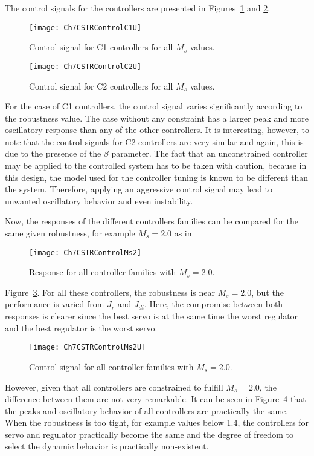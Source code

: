 The control signals for the controllers are presented in Figures~\ref{fig:Ch7CSTRControlC1U} and \ref{fig:Ch7CSTRControlC2U}. %
\begin{figure}[tb]
	\centering
	\texttt{[image: Ch7CSTRControlC1U]}
	\caption{Control signal for C1 controllers for all $M_s$ values.}
	\label{fig:Ch7CSTRControlC1U}
\end{figure}
%
\begin{figure}[tb]
	\centering
	\texttt{[image: Ch7CSTRControlC2U]}
	\caption{Control signal for C2 controllers for all $M_s$ values.}
	\label{fig:Ch7CSTRControlC2U}
\end{figure}
%
For the case of C1 controllers, the control signal varies significantly according to the robustness value. The case without any constraint has a larger peak and more oscillatory response than any of the other controllers. It is interesting, however, to note that the control signals for C2 controllers are very similar and again, this is due to the presence of the $\beta$ parameter. The fact that an unconstrained controller may be applied to the controlled system has to be taken with caution, because in this design, the model used for the controller tuning is known to be different than the system. Therefore, applying an aggressive control signal may lead to unwanted oscillatory behavior and even instability.

Now, the responses of the different controllers families can be compared for the same given robustness, for example $M_s = 2.0$ as in %
\begin{figure}[tb]
	\centering
	\texttt{[image: Ch7CSTRControlMs2]}
	\caption{Response for all controller families with $M_s = 2.0$.}
	\label{fig:Ch7CSTRControlMs2}
\end{figure}
%
Figure~\ref{fig:Ch7CSTRControlMs2}. For all these controllers, the robustness is near $M_s = 2.0$, but the performance is varied from $J_r$ and $J_{di}$. Here, the compromise between both responses is clearer since the best servo is at the same time the worst regulator and the best regulator is the worst servo.
%
\begin{figure}[tb]
	\centering
	\texttt{[image: Ch7CSTRControlMs2U]}
	\caption{Control signal for all controller families with $M_s = 2.0$.}
	\label{fig:Ch7CSTRControlMs2U}
\end{figure}
%

However, given that all controllers are constrained to fulfill $M_s = 2.0$, the difference between them are not very remarkable. It can be seen in Figure~\ref{fig:Ch7CSTRControlMs2U} that the peaks and oscillatory behavior of all controllers are practically the same. When the robustness is too tight, for example values below 1.4, the controllers for servo and regulator practically become the same and the degree of freedom to select the dynamic behavior is practically non-existent.

